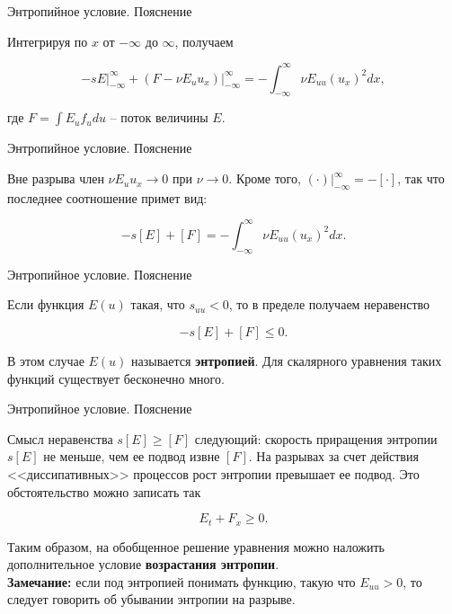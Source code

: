 \documentclass[10pt,xcolor=pst,aspectratio=169]{beamer}
\begin{document}
\begin{frame}{Энтропийное условие. Пояснение}

    \transdissolve[duration=0.1]
    \justifying
    \large

    Интегрируя по $x$ от $-\infty$ до $\infty$, получаем

    \[
        \left. -s E \right|_{-\infty}^{\infty} + \left. \left( F - \nu E_{u} u_{x} \right) \right|_{-\infty}^{\infty} = -\int_{-\infty}^{\infty}{\nu E_{uu} \left( u_{x} \right)^{2} dx},
    \]

    где $F = \int{E_{u} f_{u} du}$ -- поток величины $E$.

\end{frame}

\begin{frame}{Энтропийное условие. Пояснение}

    \transdissolve[duration=0.1]
    \justifying
    \large

    Вне разрыва член $\nu E_{u} u_{x} \rightarrow 0$ при $\nu \rightarrow 0$. Кроме того, $\left. (\cdot) \right|_{-\infty}^{\infty} = -[\cdot]$, так что последнее соотношение примет вид:

    \[
        -s [E] + [F] = -\int_{-\infty}^{\infty}{\nu E_{uu} \left( u_{x} \right)^{2} dx}.
    \]

\end{frame}

\begin{frame}{Энтропийное условие. Пояснение}

    \transdissolve[duration=0.1]
    \justifying
    \large

    Если функция $E(u)$ такая, что $s_{uu} < 0$, то в пределе получаем неравенство

    \[
        -s [E] + [F] \leq 0.
    \]

    В этом случае $E(u)$ называется \textbf{энтропией}. Для скалярного уравнения таких функций существует бесконечно много.

\end{frame}

\begin{frame}{Энтропийное условие. Пояснение}

    \transdissolve[duration=0.1]
    \justifying
    \large

    Смысл неравенства $s[E] \geq [F]$ следующий: скорость приращения энтропии $s[E]$ не меньше, чем ее подвод извне $[F]$. На разрывах за счет действия <<диссипативных>> процессов рост энтропии превышает ее подвод. Это обстоятельство можно записать так

    \[
        E_{t} + F_{x} \geq 0.
    \]

    Таким образом, на обобщенное решение уравнения можно наложить дополнительное условие \textbf{возрастания энтропии}.\\
    \textbf{Замечание:} если под энтропией понимать функцию, такую что $E_{uu} > 0$, то следует говорить об убывании энтропии на разрыве.

\end{frame}
\end{document}
